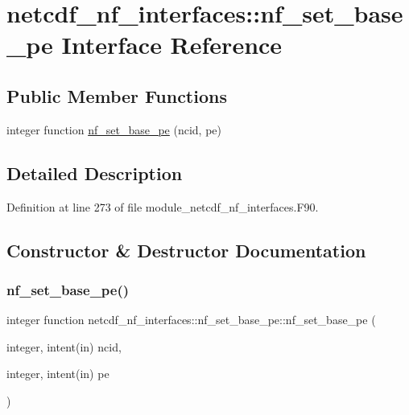 \hypertarget{interfacenetcdf__nf__interfaces_1_1nf__set__base__pe}{}\section{netcdf\+\_\+nf\+\_\+interfaces\+:\+:nf\+\_\+set\+\_\+base\+\_\+pe Interface Reference}
\label{interfacenetcdf__nf__interfaces_1_1nf__set__base__pe}
\subsection*{Public Member Functions}
\begin{DoxyCompactItemize}
\item 
integer function \hyperlink{interfacenetcdf__nf__interfaces_1_1nf__set__base__pe_ac2ecb7c66d5d216b3aec2218ec4d0a7b}{nf\+\_\+set\+\_\+base\+\_\+pe} (ncid, pe)
\end{DoxyCompactItemize}


\subsection{Detailed Description}


Definition at line 273 of file module\+\_\+netcdf\+\_\+nf\+\_\+interfaces.\+F90.



\subsection{Constructor \& Destructor Documentation}
\mbox{\label{interfacenetcdf__nf__interfaces_1_1nf__set__base__pe_ac2ecb7c66d5d216b3aec2218ec4d0a7b}} 
\subsubsection{\texorpdfstring{nf\+\_\+set\+\_\+base\+\_\+pe()}{nf\_set\_base\_pe()}}
{\footnotesize\ttfamily integer function netcdf\+\_\+nf\+\_\+interfaces\+::nf\+\_\+set\+\_\+base\+\_\+pe\+::nf\+\_\+set\+\_\+base\+\_\+pe (\begin{DoxyParamCaption}\item[{integer, intent(in)}]{ncid,  }\item[{integer, intent(in)}]{pe }\end{DoxyParamCaption})}



